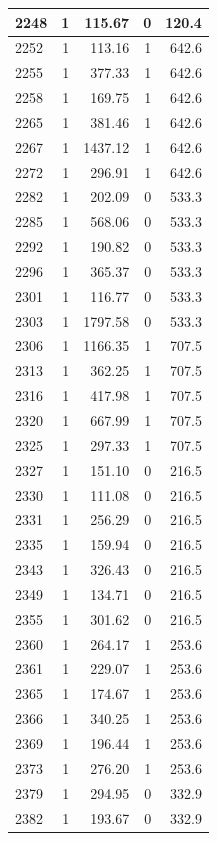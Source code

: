 \documentclass[
  spanish,
  12pt,
]{book}
\begin{document}
\begin{tabular}{l|r|r|r|r}
\hline
2248 & 1 & 115.67 & 0 & 120.4\\
\hline
2252 & 1 & 113.16 & 1 & 642.6\\
\hline
2255 & 1 & 377.33 & 1 & 642.6\\
\hline
2258 & 1 & 169.75 & 1 & 642.6\\
\hline
2265 & 1 & 381.46 & 1 & 642.6\\
\hline
2267 & 1 & 1437.12 & 1 & 642.6\\
\hline
2272 & 1 & 296.91 & 1 & 642.6\\
\hline
2282 & 1 & 202.09 & 0 & 533.3\\
\hline
2285 & 1 & 568.06 & 0 & 533.3\\
\hline
2292 & 1 & 190.82 & 0 & 533.3\\
\hline
2296 & 1 & 365.37 & 0 & 533.3\\
\hline
2301 & 1 & 116.77 & 0 & 533.3\\
\hline
2303 & 1 & 1797.58 & 0 & 533.3\\
\hline
2306 & 1 & 1166.35 & 1 & 707.5\\
\hline
2313 & 1 & 362.25 & 1 & 707.5\\
\hline
2316 & 1 & 417.98 & 1 & 707.5\\
\hline
2320 & 1 & 667.99 & 1 & 707.5\\
\hline
2325 & 1 & 297.33 & 1 & 707.5\\
\hline
2327 & 1 & 151.10 & 0 & 216.5\\
\hline
2330 & 1 & 111.08 & 0 & 216.5\\
\hline
2331 & 1 & 256.29 & 0 & 216.5\\
\hline
2335 & 1 & 159.94 & 0 & 216.5\\
\hline
2343 & 1 & 326.43 & 0 & 216.5\\
\hline
2349 & 1 & 134.71 & 0 & 216.5\\
\hline
2355 & 1 & 301.62 & 0 & 216.5\\
\hline
2360 & 1 & 264.17 & 1 & 253.6\\
\hline
2361 & 1 & 229.07 & 1 & 253.6\\
\hline
2365 & 1 & 174.67 & 1 & 253.6\\
\hline
2366 & 1 & 340.25 & 1 & 253.6\\
\hline
2369 & 1 & 196.44 & 1 & 253.6\\
\hline
2373 & 1 & 276.20 & 1 & 253.6\\
\hline
2379 & 1 & 294.95 & 0 & 332.9\\
\hline
2382 & 1 & 193.67 & 0 & 332.9\\

\end{tabular}
\end{document}
